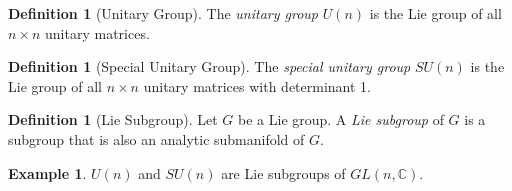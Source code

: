 \documentclass{book}
\theoremstyle{definition}
\newtheorem{df}[prop]{Definition}
\newtheorem{ex}[prop]{Example}
\begin{document}

\begin{df}[Unitary Group]
The \emph{unitary group} $U(n)$ is the Lie group of all $n \times n$ unitary matrices.
\end{df}

\begin{df}[Special Unitary Group]
The \emph{special unitary group} $SU(n)$ is the Lie group of all $n \times n$ unitary matrices with determinant 1.
\end{df}

\begin{df}[Lie Subgroup]
Let $G$ be a Lie group. A \emph{Lie subgroup} of $G$ is a subgroup that is also an analytic submanifold of $G$.
\end{df}

\begin{ex}
$U(n)$ and $SU(n)$ are Lie subgroups of $GL(n, \mathbb{C})$.
\end{ex}
\end{document}
